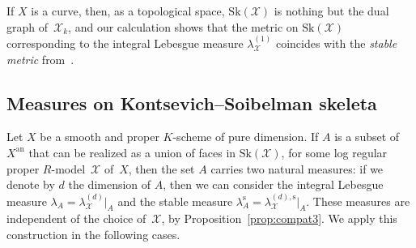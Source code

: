 \documentclass[11pt]{article}
\theoremstyle{definition}
\numberwithin{equation}{subsection}
\newcommand{\cX}{\ensuremath{\mathscr{X}}}
\newcommand{\snc}{\textit{snc}}
\newcommand{\an}{\mathrm{an}}
\newcommand{\Sk}{\mathrm{Sk}}
\newcommand{\rs}{\mathrm{s}}
\newcommand{\tdeg}{\mathrm{tdeg}}
\let\Leb\lambda
\begin{document}
If $X$ is a curve, then, as a topological space, $\Sk(\cX)$ is nothing but the dual graph of~$\cX_k$, and our calculation shows that the metric on $\Sk(\cX)$ corresponding to the integral Lebesgue measure $\Leb^{(1)}_{\cX}$ coincides with the {\em stable metric} from~\cite[A.1]{BaNi}.

\subsection{Measures on Kontsevich--Soibelman skeleta}
Let $X$ be a smooth and proper $K$\nobreakdash-scheme of pure dimension.
If $A$ is a subset of $X^{\an}$ that can be realized as a union of faces in $\Sk(\cX)$, for some log regular proper $R$\nobreakdash-model~$\cX$ of~$X$, then the set $A$ carries two natural measures: if we denote by $d$ the dimension of $A$, then we can consider the integral Lebesgue measure $\Leb_A=\Leb^{(d)}_{\cX}|_A$ and the stable measure $\Leb^{\rs}_A=\Leb^{(d),\rs}_{\cX}|_A$. These measures are independent of the choice of~$\cX$, by Proposition~\ref{prop:compat3}. We apply this construction in the following cases.
\end{document}
